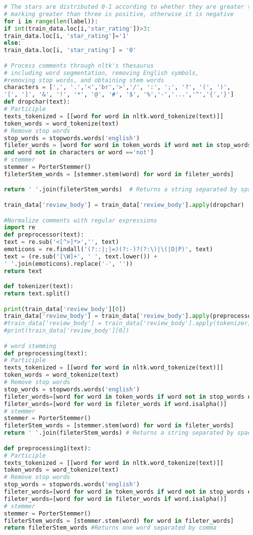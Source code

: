 \documentclass{mcmthesis}
\begin{document}
\begin{appendices}
\begin{lstlisting}[language=python]
# The stars are distributed 0-1 according to whether they are greater than three
# marking greater than three is positive, otherwise it is negative
for i in range(len(label)):
if int(train_data.loc[i,'star_rating'])>3:
train_data.loc[i, 'star_rating']='1'
else:
train_data.loc[i, 'star_rating'] = '0'

# Process comments through nltk's thesaurus
# including word segmentation, removing English symbols, 
#removing stop words, and obtaining stem words
characters = [',', '.','<','br','>','/', ':', ';', '?', '(', ')', 
'[', ']', '&', '!', '*', '@', '#', '$', '%','-','...','^','{','}']
def dropchar(text):
# Participle
texts_tokenized = [[word for word in nltk.word_tokenize(text)]]
token_words = word_tokenize(text)
# Remove stop words
stop_words = stopwords.words('english')
fileter_words = [word for word in token_words if word not in stop_words 
and word not in characters or word =='not']
# stemmer
stemmer = PorterStemmer()
fileterStem_words = [stemmer.stem(word) for word in fileter_words]

return ' '.join(fileterStem_words)  # Returns a string separated by spaces

train_data['review_body'] = train_data['review_body'].apply(dropchar)

#Normalize comments with regular expressions
import re
def preprocessor(text):
text = re.sub('<[^>]*>','', text)
emoticons = re.findall('(?::|;|=)(?:-)?(?:\)|\(|D|P)', text)
text = (re.sub('[\W]+', ' ', text.lower()) +
' '.join(emoticons).replace('-', ''))
return text

def tokenizer(text):
return text.split()

print(train_data['review_body'][0])
train_data['review_body'] = train_data['review_body'].apply(preprocessor)
#train_data['review_body'] = train_data['review_body'].apply(tokenizer)
#print(train_data['review_body'][0])

# word stemming
def preprocessing(text):
# Participle
texts_tokenized = [[word for word in nltk.word_tokenize(text)]]
token_words = word_tokenize(text)
# Remove stop words
stop_words = stopwords.words('english')
fileter_words=[word for word in token_words if word not in stop_words or word == 'not']
fileter_words=[word for word in fileter_words if word.isalpha()]
# stemmer
stemmer = PorterStemmer()
fileterStem_words = [stemmer.stem(word) for word in fileter_words]
return ' '.join(fileterStem_words) # Returns a string separated by spaces

def preprocessing1(text):
# Participle
texts_tokenized = [[word for word in nltk.word_tokenize(text)]]
token_words = word_tokenize(text)
# Remove stop words
stop_words = stopwords.words('english')
fileter_words=[word for word in token_words if word not in stop_words or word == 'not']
fileter_words=[word for word in fileter_words if word.isalpha()]
# stemmer
stemmer = PorterStemmer()
fileterStem_words = [stemmer.stem(word) for word in fileter_words]
return fileterStem_words #Returns one word separated by comma


\end{lstlisting}
\end{appendices}
\end{document}
